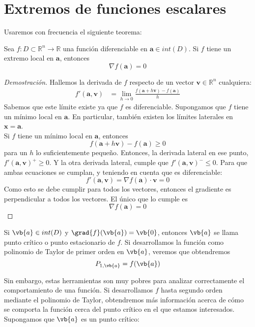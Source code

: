\documentclass{../Calculo.tex}
\begin{document}
\section{Extremos de funciones escalares}
Usaremos con frecuencia el siguiente teorema:
\begin{teorema}
Sea $f:D \subset \mathbb{R}^{n} \to \mathbb{R}$ una función diferenciable en $\mathbf{a} \in int(D)$. Si $f$ tiene un extremo local en $\mathbf{a}$, entonces
\[
	\nabla f(\mathbf{a}) = 0
\]
\end{teorema}
\begin{proof}[Demostración]
Hallemos la derivada de $f$ respecto de un vector $\mathbf{v} \in \mathbb{R}^{n}$ cualquiera:
\begin{equation}
	\begin{split}
		f'(\mathbf{a}, \mathbf{v}) &= \lim_{h \to 0} \frac{f(\mathbf{a}+h \mathbf{v})-f(\mathbf{a})}{h}
	\end{split}
\end{equation}
Sabemos que este límite existe ya que $f$ es diferenciable. Supongamos que $f$ tiene un mínimo local en $\mathbf{a}$. En particular, también existen los límites laterales en $\mathbf{x}=\mathbf{a}$.\\
Si $f$ tiene un mínimo local en $\mathbf{a}$, entonces
\[
	f(\mathbf{a}+h \mathbf{v})-f(\mathbf{a}) \geq 0
\]
para un $h$ lo suficientemente pequeño. Entonces, la derivada lateral en ese punto, $f'(\mathbf{a}, \mathbf{v})^{+} \geq 0$. Y la otra derivada lateral, cumple que $f'(\mathbf{a}, \mathbf{v})^{-} \leq 0$. Para que ambas ecuaciones se cumplan, y teniendo en cuenta que es diferenciable:
\[
	f'(\mathbf{a}, \mathbf{v})= \nabla f(\mathbf{a}) \cdot \mathbf{v} =0
\]
Como esto se debe cumplir para todos los vectores, entonces el gradiente es perpendicular a todos los vectores. El único que lo cumple es
\[
	\nabla f(\mathbf{a}) = 0
\]
\end{proof}
\begin{defin}
	Si $\vb{a} \in int(D)$ y $\grad{f}(\vb{a})= \vb{0}$, entonces $\vb{a}$ se llama punto crítico o punto estacionario de $f$. Si desarrollamos la función como polinomio de Taylor de primer orden en $\vb{a}$, veremos que obtendremos
	\[
		P_{1, \vb{a}} = f(\vb{a})
	\]
\end{defin}
Sin embargo, estas herramientas son muy pobres para analizar correctamente el comportamiento de una función. Si desarrollamos $f$ hasta segundo orden mediante el polinomio de Taylor, obtendremos más información acerca de cómo se comporta la función cerca del punto crítico en el que estamos interesados. Supongamos que $\vb{a}$ es un punto crítico:
\end{document}
